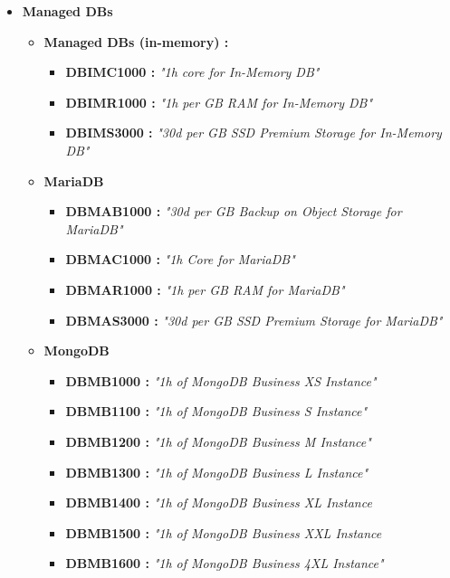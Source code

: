 \begin{itemize}
    \item \textbf{Managed DBs} \begin{itemize}
              \item \textbf{Managed DBs (in-memory) :} \begin{itemize}
                        \item \textbf{DBIMC1000 : } \textit{"1h core for In-Memory DB"}
                        \item \textbf{DBIMR1000 : } \textit{"1h per GB RAM for In-Memory DB"}
                        \item \textbf{DBIMS3000 : } \textit{"30d per GB SSD Premium Storage for In-Memory DB"}
                    \end{itemize}
              \item \textbf{MariaDB } \begin{itemize}
                        \item \textbf{DBMAB1000 : } \textit{"30d per GB Backup on Object Storage for MariaDB"}
                        \item \textbf{DBMAC1000 : } \textit{"1h Core for MariaDB"}
                        \item \textbf{DBMAR1000 : } \textit{"1h per GB RAM for MariaDB"}
                        \item \textbf{DBMAS3000 : } \textit{"30d per GB SSD Premium Storage for MariaDB"}
                    \end{itemize}
              \item \textbf{MongoDB } \begin{itemize}
                        \item \textbf{DBMB1000 : } \textit{"1h of MongoDB Business XS Instance"}
                        \item \textbf{DBMB1100 : } \textit{"1h of MongoDB Business S Instance"}
                        \item \textbf{DBMB1200 : } \textit{"1h of MongoDB Business M Instance"}
                        \item \textbf{DBMB1300 : } \textit{"1h of MongoDB Business L Instance"}
                        \item \textbf{DBMB1400 : } \textit{"1h of MongoDB Business XL Instance}
                        \item \textbf{DBMB1500 : } \textit{"1h of MongoDB Business XXL Instance}
                        \item \textbf{DBMB1600 : } \textit{"1h of MongoDB Business 4XL Instance"}

\end{itemize}
\end{itemize}
\end{itemize}
